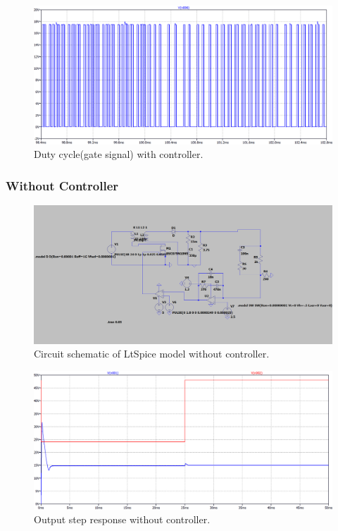 \documentclass{article}
\begin{document}
\begin{figure}[H]
    \centering
    \includegraphics[scale=0.4]{24 to 48 v input(controlculu)(duty cycle).png}
    \caption{Duty cycle(gate signal) with controller.}
    \label{fig:my_label}
\end{figure}




\subsubsection{Without Controller}


\begin{figure}[H]
    \centering
    \includegraphics[scale=0.4]{24 to 48 v input(controlcu kullanmadan)(devre şematiğii.png}
    \caption{Circuit schematic of LtSpice model without controller.}
    \label{fig:my_label}
\end{figure}


\begin{figure}[H]
    \centering
    \includegraphics[scale=0.4]{24 to 48 v input(controlcu kullanmadan).PNG}
    \caption{Output step response without controller.}
    \label{fig:my_label}
\end{figure}
\end{document}
